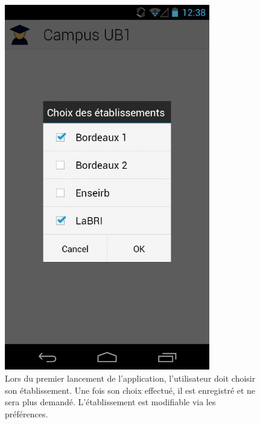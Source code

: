 \documentclass [pdftex,12pt] {report}
\begin{document}
\begin{figure}
  \begin{minipage}[t]{8cm}
    \centering
    \includegraphics[width=0.8\textwidth]{resources/ui_preview/01}
    \caption{Lors du premier lancement de l'application, l'utilisateur doit choisir son établissement. Une fois son choix effectué, il est enregistré et ne sera plus demandé. L'établissement est modifiable via les préférences.}
    \label{fig:01}
  \end{minipage}
  \hspace{+20pt}
  \begin{minipage}[t]{8cm}
    \centering

\end{minipage}
\end{figure}
\end{document}
